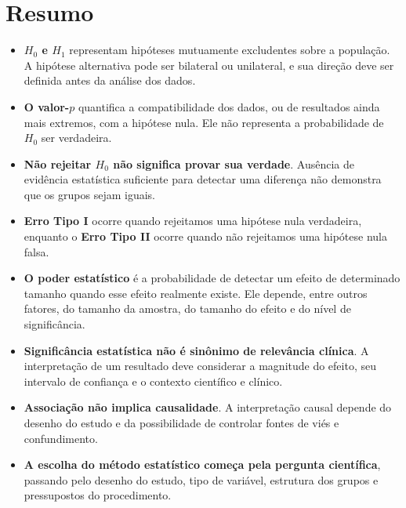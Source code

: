 \section{Resumo}
\begin{itemize}
    \item \textbf{$H_0$ e $H_1$} representam hipóteses mutuamente excludentes
    sobre a população. A hipótese alternativa pode ser bilateral ou
    unilateral, e sua direção deve ser definida antes da análise dos dados.

    \item \textbf{O valor-$p$} quantifica a compatibilidade dos dados, ou de
    resultados ainda mais extremos, com a hipótese nula. Ele não representa a
    probabilidade de $H_0$ ser verdadeira.

    \item \textbf{Não rejeitar $H_0$ não significa provar sua verdade}.
    Ausência de evidência estatística suficiente para detectar uma diferença
    não demonstra que os grupos sejam iguais.

    \item \textbf{Erro Tipo I} ocorre quando rejeitamos uma hipótese nula
    verdadeira, enquanto o \textbf{Erro Tipo II} ocorre quando não rejeitamos
    uma hipótese nula falsa.

    \item \textbf{O poder estatístico} é a probabilidade de detectar um efeito
    de determinado tamanho quando esse efeito realmente existe. Ele depende,
    entre outros fatores, do tamanho da amostra, do tamanho do efeito e do
    nível de significância.

    \item \textbf{Significância estatística não é sinônimo de relevância
    clínica}. A interpretação de um resultado deve considerar a magnitude do
    efeito, seu intervalo de confiança e o contexto científico e clínico.

    \item \textbf{Associação não implica causalidade}. A interpretação causal
    depende do desenho do estudo e da possibilidade de controlar fontes de
    viés e confundimento.

    \item \textbf{A escolha do método estatístico começa pela pergunta
    científica}, passando pelo desenho do estudo, tipo de variável, estrutura
    dos grupos e pressupostos do procedimento.
\end{itemize}

